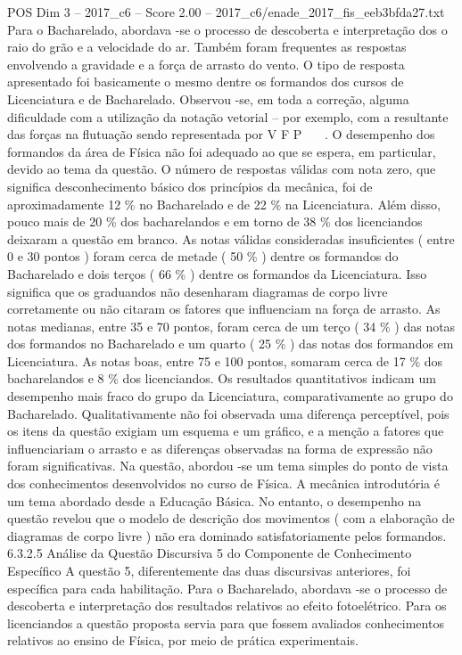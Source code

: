 \begin{textsample}{POS Dim 3 – 2017\_c6 – Score 2.00 – 2017\_c6/enade\_2017\_fis\_eeb3bfda27.txt}
Para o Bacharelado, abordava -se o processo de descoberta e interpretação dos o raio do grão e a velocidade do ar.
Também foram frequentes as respostas envolvendo a gravidade e a força de arrasto do vento.
O tipo de resposta apresentado foi basicamente o mesmo dentre os formandos dos cursos de Licenciatura e de Bacharelado.
Observou -se, em toda a correção, alguma dificuldade com a utilização da notação vetorial – por exemplo, com a resultante das forças na flutuação sendo representada por V F P   .
O desempenho dos formandos da área de Física não foi adequado ao que se espera, em particular, devido ao tema da questão.
O número de respostas válidas com nota zero, que significa desconhecimento básico dos princípios da mecânica, foi de aproximadamente 12 \% no Bacharelado e de 22 \% na Licenciatura.
Além disso, pouco mais de 20 \% dos bacharelandos e em torno de 38 \% dos licenciandos deixaram a questão em branco.
As notas válidas consideradas insuficientes ( entre 0 e 30 pontos ) foram cerca de metade ( 50 \% ) dentre os formandos do Bacharelado e dois terços ( 66 \% ) dentre os formandos da Licenciatura.
Isso significa que os graduandos não desenharam diagramas de corpo livre corretamente ou não citaram os fatores que influenciam na força de arrasto.
As notas medianas, entre 35 e 70 pontos, foram cerca de um terço ( 34 \% ) das notas dos formandos no Bacharelado e um quarto ( 25 \% ) das notas dos formandos em Licenciatura.
As notas boas, entre 75 e 100 pontos, somaram cerca de 17 \% dos bacharelandos e 8 \% dos licenciandos.
Os resultados quantitativos indicam um desempenho mais fraco do grupo da Licenciatura, comparativamente ao grupo do Bacharelado.
Qualitativamente não foi observada uma diferença perceptível, pois os itens da questão exigiam um esquema e um gráfico, e a menção a fatores que influenciariam o arrasto e as diferenças observadas na forma de expressão não foram significativas.
Na questão, abordou -se um tema simples do ponto de vista dos conhecimentos desenvolvidos no curso de Física.
A mecânica introdutória é um tema abordado desde a Educação Básica.
No entanto, o desempenho na questão revelou que o modelo de descrição dos movimentos ( com a elaboração de diagramas de corpo livre ) não era dominado satisfatoriamente pelos formandos. 6.3.2.5 Análise da Questão Discursiva 5 do Componente de Conhecimento Específico A questão 5, diferentemente das duas discursivas anteriores, foi específica para cada habilitação.
Para o Bacharelado, abordava -se o processo de descoberta e interpretação dos resultados relativos ao efeito fotoelétrico.
Para os licenciandos a questão proposta servia para que fossem avaliados conhecimentos relativos ao ensino de Física, por meio de prática experimentais.

\end{textsample}
